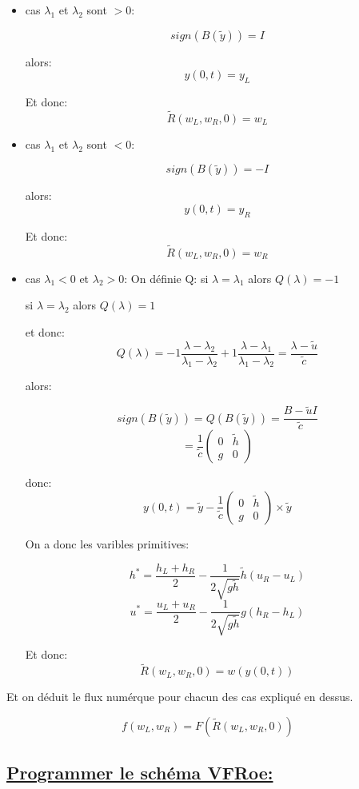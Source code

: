 \begin{itemize}
\item cas $\lambda_1$ et $\lambda_2$ sont $>0$:

$$sign(B(\tilde y) ) = I$$

alors: $$y(0,t) = y_L$$

Et donc:
$$\tilde{R}(w_L,w_R,0) = w_L$$

\item cas $\lambda_1$ et $\lambda_2$ sont $<0$:

$$sign(B(\tilde y) ) = -I$$

alors: $$y(0,t) = y_R$$

Et donc:
$$\tilde{R}(w_L,w_R,0) = w_R$$

\item cas $\lambda_1 < 0$ et $\lambda_2 > 0$:
On d\'efinie Q:
si $\lambda = \lambda_1$  alors $Q(\lambda) = -1$

si $\lambda = \lambda_2$  alors $Q(\lambda) = 1$

et donc: $$Q(\lambda) = -1\frac{\lambda-\lambda_2}{\lambda_1-\lambda_2} + 1\frac{\lambda-\lambda_1}{\lambda_1-\lambda_2} = \frac{\lambda - \tilde{u}}{\tilde{c}}$$

alors:

$$sign(B(\tilde y) ) = Q(B(\tilde y) ) =  \frac{B - \tilde{u}I}{\tilde{c}} $$
$$ = \frac{1}{\tilde c} \begin{pmatrix}
0 & \tilde h \\
g & 0 
\end{pmatrix}$$

donc:
$$ y(0,t) = \tilde{y} - \frac{1}{\tilde c} \begin{pmatrix}
0 & \tilde h \\
g & 0 
\end{pmatrix} \times \tilde{y}$$

On a donc les varibles primitives:

$$ h^* = \frac{h_L + h_R}{2} - \frac{1}{2\sqrt{g \tilde{h}}} \tilde{h}(u_R -u_L)$$
$$ u^* = \frac{u_L + u_R}{2} - \frac{1}{2\sqrt{g \tilde{h}}} g (h_R -h_L)$$

Et donc:
$$\tilde{R}(w_L,w_R,0) = w(y(0,t))$$

\end{itemize}

Et on d\'eduit le flux num\'erque pour chacun des cas expliqu\'e en dessus.

$$f(w_L,w_R) = F(\tilde{R}(w_L,w_R,0)) $$

 

\subsection[Programmer le sch\'ema VFRoe]{\uline{Programmer le sch\'ema VFRoe:}}

